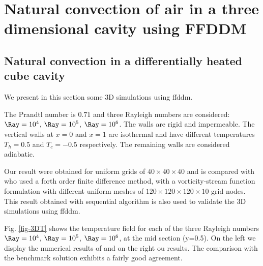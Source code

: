 \section{Natural convection of air in a three dimensional cavity using FFDDM}\label{sec: natconv-air-3D}

\subsection{Natural convection in a differentially heated cube cavity}
We present in this section some 3D simulations using ffddm.

The Prandtl number is $0.71$ and three Rayleigh numbers are considered:  $\Ray=10^4$, $\Ray=10^5$, $\Ray=10^6$. The walls are rigid and impermeable. The vertical walls at $x=0$ and $x=1$ are isothermal and have different temperatures $T_h=0.5$ and $T_c=-0.5$ respectively. The remaining walls are considered adiabatic. %
 
Our result were obtained for uniform grids of $  40 \times 40 \times 40$ and is compared with \cite{Wakashima-2004} who used a forth order finite difference method, with a vorticity-stream function formulation with different uniform meshes of  $120 \times 120 \times 120 \times 10$ grid nodes. 
This result obtained with sequential algorithm is also used to validate the 3D simulations using ffddm.

Fig. \ref{fig-3DT} shows the temperature field for each of the three Rayleigh numbers $\Ray = 10^4$, $\Ray = 10^5$, $\Ray = 10^6$, at the mid section (y=0.5).
On the left we display the numerical results of \cite{Wakashima-2004} and on the right ou results.
The comparison with the benchmark solution exhibits a fairly good agreement.

